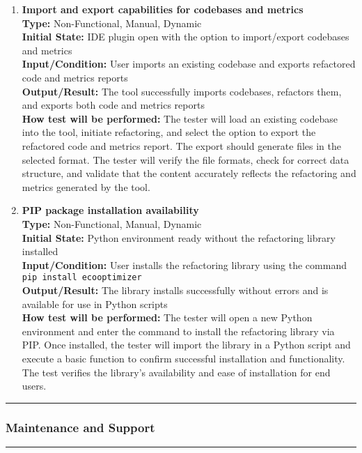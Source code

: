 \documentclass[12pt, titlepage]{article}
\newcommand{\colorrule}{\textcolor{BlueViolet}{\rule{\linewidth}{2pt}}}
\begin{document}
\begin{enumerate}[label={\bf \textcolor{Maroon}{test-OPE-\arabic*}}, wide=0pt, font=\itshape]
  \item \textbf{Import and export capabilities for codebases and metrics} \\[2mm]
    \textbf{Type:} Non-Functional, Manual, Dynamic \\
    \textbf{Initial State:} IDE plugin open with the option to import/export codebases and metrics \\
    \textbf{Input/Condition:} User imports an existing codebase and exports refactored code and metrics reports \\
    \textbf{Output/Result:} The tool successfully imports codebases, refactors them, and exports both code and metrics reports \\[2mm]
    \textbf{How test will be performed:} The tester will load an existing codebase into the tool, initiate refactoring, and select the option to export the refactored code and metrics report. The export should generate files in the selected format. The tester will verify the file formats, check for correct data structure, and validate that the content accurately reflects the refactoring and metrics generated by the tool.

  \item \textbf{PIP package installation availability} \\[2mm]
    \textbf{Type:} Non-Functional, Manual, Dynamic \\
    \textbf{Initial State:} Python environment ready without the refactoring library installed \\
    \textbf{Input/Condition:} User installs the refactoring library using the command \texttt{pip install ecooptimizer} \\
    \textbf{Output/Result:} The library installs successfully without errors and is available for use in Python scripts \\[2mm]
    \textbf{How test will be performed:} The tester will open a new Python environment and enter the command to install the refactoring library via PIP. Once installed, the tester will import the library in a Python script and execute a basic function to confirm successful installation and functionality. The test verifies the library’s availability and ease of installation for end users.

\end{enumerate}

\noindent
\colorrule

\subsubsection{Maintenance and Support}
\colorrule
\end{document}
